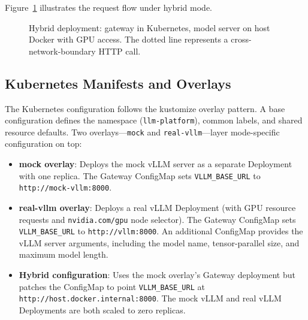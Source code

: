 \documentclass[10pt,journal]{IEEEtran}
\begin{document}
Figure~\ref{fig:hybrid} illustrates the request flow under hybrid mode.

\begin{figure}[t]
\centering
{}
\caption{Hybrid deployment: gateway in Kubernetes, model server on host Docker with GPU access. The dotted line represents a cross-network-boundary HTTP call.}
\label{fig:hybrid}
\end{figure}

\subsection{Kubernetes Manifests and Overlays}

The Kubernetes configuration follows the kustomize overlay pattern. A base configuration defines the namespace (\texttt{llm-platform}), common labels, and shared resource defaults. Two overlays---\texttt{mock} and \texttt{real-vllm}---layer mode-specific configuration on top:

\begin{itemize}
  \item \textbf{mock overlay}: Deploys the mock vLLM server as a separate Deployment with one replica. The Gateway ConfigMap sets \texttt{VLLM\_BASE\_URL} to \texttt{http://mock-vllm:8000}.
  \item \textbf{real-vllm overlay}: Deploys a real vLLM Deployment (with GPU resource requests and \texttt{nvidia.com/gpu} node selector). The Gateway ConfigMap sets \texttt{VLLM\_BASE\_URL} to \texttt{http://vllm:8000}. An additional ConfigMap provides the vLLM server arguments, including the model name, tensor-parallel size, and maximum model length.
  \item \textbf{Hybrid configuration}: Uses the mock overlay's Gateway deployment but patches the ConfigMap to point \texttt{VLLM\_BASE\_URL} at \texttt{http://host.docker.internal:8000}. The mock vLLM and real vLLM Deployments are both scaled to zero replicas.
\end{itemize}
\end{document}
